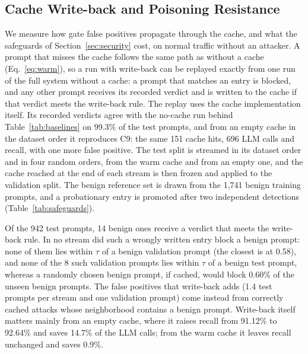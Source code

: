 \documentclass[runningheads]{llncs}
\newif\ifrev
\newcommand{\rev}[1]{\ifrev\hl{#1}\else#1\fi}                  %
\begin{document}
\subsection{\texorpdfstring{\protect\rev{Cache Write-back and Poisoning Resistance}}{Cache Write-back and Poisoning Resistance}}\label{sec:cache-eval}
\rev{We measure how gate false positives propagate through the cache, and what the safeguards of Section~\ref{sec:security} cost, on normal traffic without an attacker. A prompt that misses the cache follows the same path as without a cache (Eq.~\eqref{eq:warm}), so a run with write-back can be replayed exactly from one run of the full system without a cache: a prompt that matches an entry is blocked, and any other prompt receives its recorded verdict and is written to the cache if that verdict meets the write-back rule. The replay uses the cache implementation itself. Its recorded verdicts agree with the no-cache run behind Table~\ref{tab:baselines} on 99.3\% of the test prompts, and from an empty cache in the dataset order it reproduces C9: the same 151 cache hits, 696 LLM calls and recall, with one more false positive. The test split is streamed in its dataset order and in four random orders, from the warm cache and from an empty one, and the cache reached at the end of each stream is then frozen and applied to the validation split. The benign reference set is drawn from the 1{,}741 benign training prompts, and a probationary entry is promoted after two independent detections (Table~\ref{tab:safeguards}).}

\rev{Of the 942 test prompts, 14 benign ones receive a verdict that meets the write-back rule. In no stream did such a wrongly written entry block a benign prompt: none of them lies within $\tau$ of a benign validation prompt (the closest is at 0.58), and none of the 8 such validation prompts lies within $\tau$ of a benign test prompt, whereas a randomly chosen benign prompt, if cached, would block 0.60\% of the unseen benign prompts. The false positives that write-back adds (1.4 test prompts per stream and one validation prompt) come instead from correctly cached attacks whose neighborhood contains a benign prompt. Write-back itself matters mainly from an empty cache, where it raises recall from 91.12\% to 92.64\% and saves 14.7\% of the LLM calls; from the warm cache it leaves recall unchanged and saves 0.9\%.}
\end{document}
